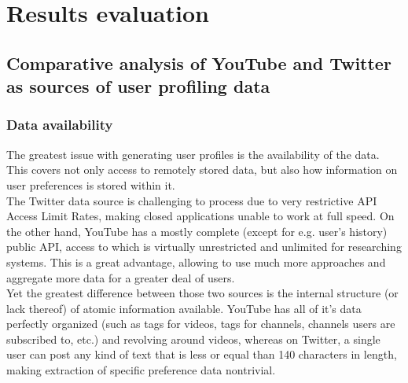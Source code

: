 \section{Results evaluation}

\subsection{Comparative analysis of YouTube and Twitter as sources of user
profiling data}

\subsubsection{Data availability}
The greatest issue with generating user profiles is the availability of the data. This covers not only access to remotely
stored data, but also how information on user preferences is stored within it.
\\ The Twitter data source is challenging to process due to very restrictive API Access Limit Rates, making closed applications
unable to work at full speed. On the other hand, YouTube has a mostly complete (except for e.g. user's history) public API,
access to which is virtually unrestricted and unlimited for researching systems. This is a great advantage, allowing to use
much more approaches and aggregate more data for a greater deal of users.
\\ Yet the greatest difference between those two sources is the internal structure (or lack thereof) of atomic information
available. YouTube has all of it's data perfectly organized (such as tags for videos, tags for channels, channels users are
subscribed to, etc.) and revolving around videos, whereas on Twitter, a single user can post any kind of text that is
less or equal than 140 characters in length, making extraction of specific preference data nontrivial.

